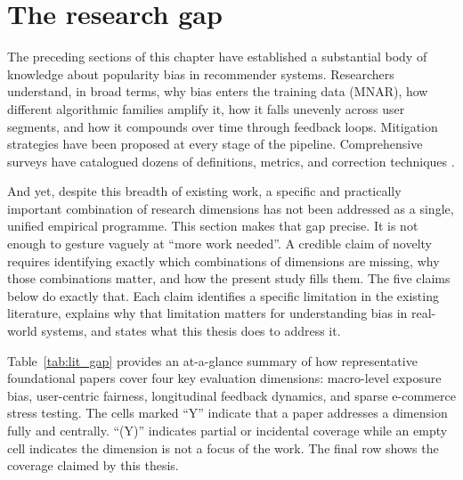 \documentclass[11pt,a4paper]{report}
\begin{document}
\section{The research gap}
\label{sec:lit_gap}

The preceding sections of this chapter have established a substantial body of knowledge about popularity bias in recommender systems. Researchers understand, in broad terms, why bias enters the training data (MNAR), how different algorithmic families amplify it, how it falls unevenly across user segments, and how it compounds over time through feedback loops. Mitigation strategies have been proposed at every stage of the pipeline. Comprehensive surveys have catalogued dozens of definitions, metrics, and correction techniques \citep{klimashevskaia2024survey}.

And yet, despite this breadth of existing work, a specific and practically important combination of research dimensions has not been addressed as a single, unified empirical programme. This section makes that gap precise. It is not enough to gesture vaguely at ``more work needed''. A credible claim of novelty requires identifying exactly which combinations of dimensions are missing, why those combinations matter, and how the present study fills them. The five claims below do exactly that. Each claim identifies a specific limitation in the existing literature, explains why that limitation matters for understanding bias in real-world systems, and states what this thesis does to address it.

Table~\ref{tab:lit_gap} provides an at-a-glance summary of how representative foundational papers cover four key evaluation dimensions: macro-level exposure bias, user-centric fairness, longitudinal feedback dynamics, and sparse e-commerce stress testing. The cells marked ``Y'' indicate that a paper addresses a dimension fully and centrally. ``(Y)'' indicates partial or incidental coverage while an empty cell indicates the dimension is not a focus of the work. The final row shows the coverage claimed by this thesis.
\end{document}
